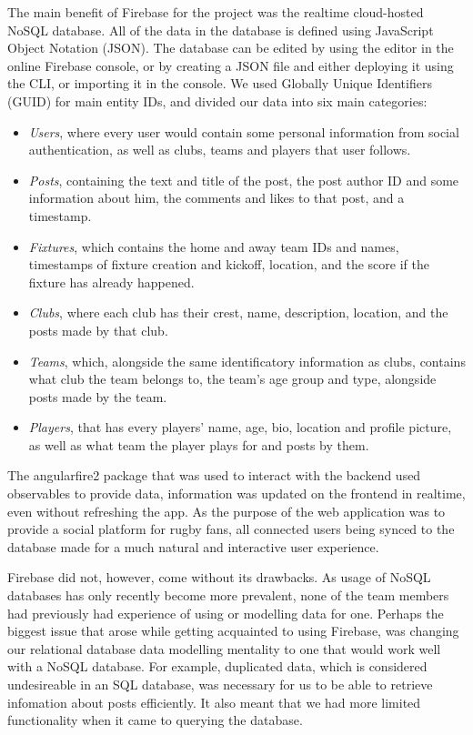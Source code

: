 \documentclass{l3proj}
\begin{document}
The main benefit of Firebase for the project was the realtime cloud-hosted
 NoSQL database. All of the data in the database is defined using JavaScript
 Object Notation (JSON). The database can be edited by using the editor
 in the online Firebase console, or by creating a JSON file and either deploying 
 it using the CLI, or importing it in the console. We used Globally Unique
 Identifiers (GUID) for main entity IDs, and divided our data into six main categories:
\begin{itemize}
\item
\textit{Users}, where every user would contain some personal information
 from social authentication, as well as clubs, teams and players that user
 follows.

\item
\textit{Posts}, containing the text and title of the post, the post
 author ID and some information about him, the comments and likes to
 that post, and a timestamp.

\item
\textit{Fixtures}, which contains the home and away team IDs and names,
 timestamps of fixture creation and kickoff, location, and the score if
 the fixture has already happened.

\item
\textit{Clubs}, where each club has their crest, name, description,
location, and the posts made by that club.

\item
\textit{Teams}, which, alongside the same identificatory information as
clubs, contains what club the team belongs to, the team's age group and
type, alongside posts made by the team.

\item
\textit{Players}, that has every players' name, age, bio, location and
 profile picture, as well as what team the player plays for and posts
 by them.

\end{itemize}
The angularfire2 package that was used to interact with the backend used
 observables to provide data, information was updated on the frontend in 
 realtime, even without refreshing the app. As the purpose of the web 
 application was to provide a social platform for rugby fans, all connected 
 users being synced to the database made for a much natural and interactive 
 user experience.



Firebase did not, however, come without its drawbacks. As usage of NoSQL
 databases has only recently become more prevalent, none of the team members
 had previously had experience of using or modelling data for one. Perhaps
 the biggest issue that arose while getting acquainted to using Firebase, was
 changing our relational database data modelling mentality to one that would work
 well with a NoSQL database. For example, duplicated data, which is considered
 undesireable in an SQL database, was necessary for us to be able to retrieve
 infomation about posts efficiently. It also meant that we had more limited
 functionality when it came to querying the database.
\end{document}
